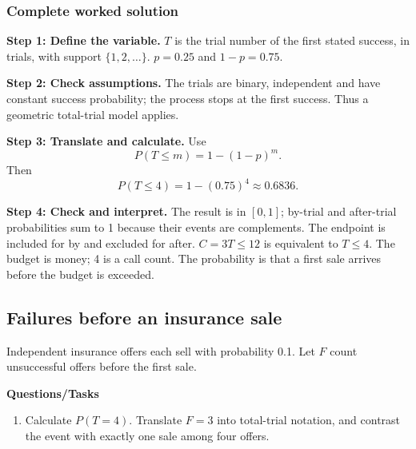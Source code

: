 \subsubsection*{Complete worked solution}
\par\noindent\begin{minipage}{\linewidth}
\textbf{Step 1: Define the variable.} $T$ is the trial number of the first stated success, in trials, with support $\{1,2,\ldots\}$. $p=0.25$ and $1-p=0.75$.
\end{minipage}\par\medskip
\par\noindent\begin{minipage}{\linewidth}
\textbf{Step 2: Check assumptions.} The trials are binary, independent and have constant success probability; the process stops at the first success. Thus a geometric total-trial model applies.
\end{minipage}\par\medskip
\par\noindent\begin{minipage}{\linewidth}
\textbf{Step 3: Translate and calculate.} Use
\[P(T\leq m)=1-(1-p)^m.\]
Then
\[P(T\leq4)=1-(0.75)^4\approx 0.6836.\]
\end{minipage}\par\medskip
\par\noindent\begin{minipage}{\linewidth}
\textbf{Step 4: Check and interpret.} The result is in $[0,1]$; by-trial and after-trial probabilities sum to 1 because their events are complements. The endpoint is included for by and excluded for after. $C=3T\leq12$ is equivalent to $T\leq4$. The budget is money; 4 is a call count. The probability is that a first sale arrives before the budget is exceeded.
\end{minipage}\par\medskip
{}
\subsection{Failures before an insurance sale}
Independent insurance offers each sell with probability 0.1. Let $F$ count unsuccessful offers before the first sale.

\textbf{Questions/Tasks}
\begin{enumerate}
\item Calculate $P(T=4)$. Translate $F=3$ into total-trial notation, and contrast the event with exactly one sale among four offers.
\end{enumerate}
